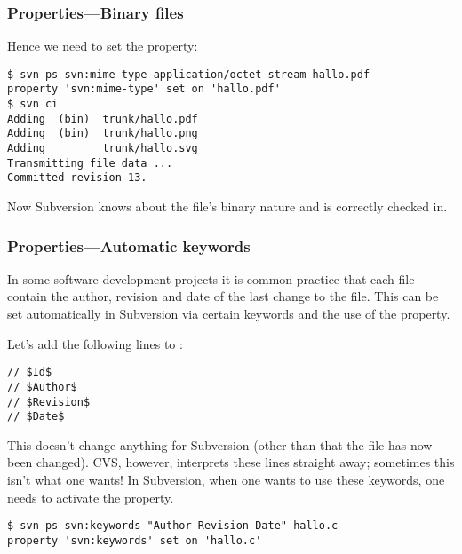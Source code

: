 \begin{frame}[fragile]
    \frametitle{Properties---Binary files}
    \linuxframe

    Hence we need to set the  property:
\begin{lstlisting}
$ svn ps svn:mime-type application/octet-stream hallo.pdf
property 'svn:mime-type' set on 'hallo.pdf'
$ svn ci
Adding  (bin)  trunk/hallo.pdf
Adding  (bin)  trunk/hallo.png
Adding         trunk/hallo.svg
Transmitting file data ...
Committed revision 13.
\end{lstlisting}
    Now Subversion knows about the file's binary nature and is correctly
    checked in.
\end{frame}

\begin{frame}[fragile]
    \frametitle{Properties---Automatic keywords}
    \linuxframe

    In some software development projects it is common practice that each
    file contain the author, revision and date of the last change to the
    file.  This can be set automatically in Subversion via certain keywords
    and the use of the  property.

    Let's add the following lines to :
\begin{lstlisting}
// $Id$
// $Author$
// $Revision$
// $Date$
\end{lstlisting}
    This doesn't change anything for Subversion (other than that the file
    has now been changed).  CVS, however, interprets these lines straight
    away; sometimes this isn't what one wants!  In Subversion, when one
    wants to use these keywords, one needs to activate the
     property.

\begin{lstlisting}
$ svn ps svn:keywords "Author Revision Date" hallo.c
property 'svn:keywords' set on 'hallo.c'
\end{lstlisting}
\end{frame}

